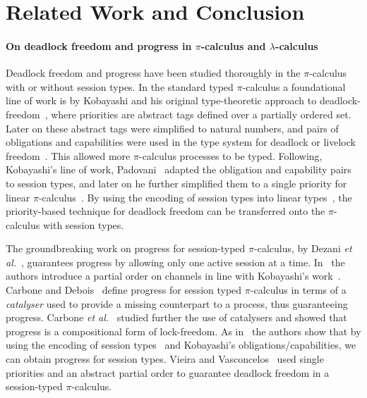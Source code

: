 \documentclass[main.tex]{subfiles}
\begin{document}
\section{Related Work and Conclusion}

\paragraph{On deadlock freedom and progress in $\pi$-calculus and $\lambda$-calculus}
Deadlock freedom and progress have been studied thoroughly in the $\pi$-calculus with or without session types.
In the standard typed $\pi$-calculus a foundational line of work is by Kobayashi and his original type-theoretic approach to deadlock-freedom~\cite{kobayashi98}, where priorities are abstract tags defined over a partially ordered set. Later on these abstract tags were simplified to natural numbers, and pairs of obligations and capabilities were used in the type system for deadlock or livelock freedom~\cite{kobayashi02,kobayashi06}. This allowed more $\pi$-calculus processes to be typed. Following, Kobayashi's line of work, Padovani~\cite{padovani13} adapted the obligation and capability pairs to session types, and later on he further simplified them to a single priority for linear $\pi$-calculus~\cite{padovani14}. By using the encoding of session types into linear types~\cite{kobayashi07,dardhagiachino12,dardha14beat,dardha16}, the priority-based technique for deadlock freedom can be transferred onto the $\pi$-calculus with session types.

The groundbreaking work on progress for session-typed $\pi$-calculus, by Dezani \emph{et al.}~\cite{dezani-ciancaglinimostrous06}, guarantees progress by allowing only one active session at a time. In~\cite{dezani-ciancagliniliguoro09progress} the authors introduce a partial order on channels in line with Kobayashi's work~\cite{kobayashi98}. Carbone and Debois~\cite{carbonedebois10} define progress for session typed $\pi$-calculus in terms of a \emph{catalyser} used to provide a missing counterpart to a process, thus guaranteeing progress.
Carbone \emph{et al.}~\cite{carbonedardha14} studied further the use of catalysers and showed that progress is a compositional form of lock-freedom. As in~\cite{padovani14} the authors show that by using the encoding of session types~\cite{dardhagiachino12} and Kobayashi's obligations/capabilities, we can obtain progress for session types. Vieira and Vasconcelos~\cite{vieiravasconcelos13} used single priorities and an abstract partial order to guarantee deadlock freedom in a session-typed $\pi$-calculus.
\end{document}
